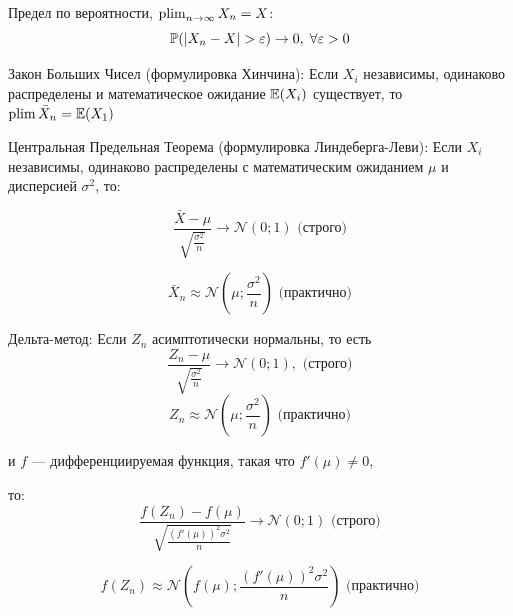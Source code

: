 \documentclass[12pt, a4paper]{article}
\def \cN{\mathcal{N}}
\begin{document}
Предел по вероятности, $\plim_{n\to\infty} X_n = X$:
\[
\P(|X_n - X| > \varepsilon ) \to 0, \; \forall \varepsilon > 0
\]



Закон Больших Чисел (формулировка Хинчина): Если $X_i$ независимы, одинаково распределены и математическое ожидание $\E(X_i)$ существует, то $\plim \bar X_n = \E(X_1)$

Центральная Предельная Теорема (формулировка Линдеберга-Леви): Если $X_i$ независимы, одинаково распределены с математическим ожиданием $\mu$ и дисперсией $\sigma^2$, то:

\[
\frac{\bar X - \mu }{\sqrt{\frac{\sigma^2}{n}}} \to \cN(0;1) \text{ (строго)}
\]

\[
\bar X_n \approx \cN\left(\mu; \frac{\sigma^2}{n} \right) \text{ (практично)}
\]


Дельта-метод: Если $Z_n$ асимптотически нормальны, то есть
\[
\frac{Z_n - \mu }{\sqrt{\frac{\sigma^2}{n}}} \to \cN(0;1), \text{ (строго)}
\]
\[
Z_n \approx \cN\left(\mu; \frac{\sigma^2}{n} \right) \text{ (практично)}
\]

и $f$ — дифференциируемая функция, такая что $f'(\mu) \neq 0$,

то:
\[
\frac{f(Z_n) - f(\mu) }{\sqrt{\frac{(f'(\mu))^2\sigma^2}{n}}} \to \cN(0;1) \text{ (строго)}
\]

\[
f(Z_n) \approx \cN\left(f(\mu); \frac{(f'(\mu))^2\sigma^2}{n} \right) \text{ (практично)}
\]
\end{document}
